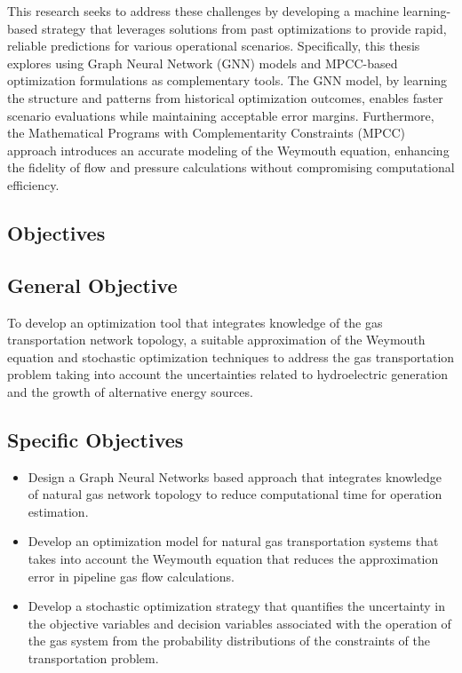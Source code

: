 This research seeks to address these challenges by developing a machine learning-based strategy that leverages solutions from past optimizations to provide rapid, reliable predictions for various operational scenarios. Specifically, this thesis explores using Graph Neural Network (GNN) models and MPCC-based optimization formulations as complementary tools. The GNN model, by learning the structure and patterns from historical optimization outcomes, enables faster scenario evaluations while maintaining acceptable error margins. Furthermore, the Mathematical Programs with Complementarity Constraints (MPCC) approach introduces an accurate modeling of the Weymouth equation, enhancing the fidelity of flow and pressure calculations without compromising computational efficiency.





\subsection{Objectives}

\subsection{General Objective}
To develop an optimization tool that integrates knowledge of the gas transportation network topology, a suitable approximation of the Weymouth equation and stochastic optimization techniques to address the gas transportation problem taking into account the uncertainties related to hydroelectric generation and the growth of alternative energy sources.

\subsection{Specific Objectives}
\begin{itemize}

\item Design a Graph Neural Networks based approach that integrates knowledge of natural gas network topology to reduce computational time for operation estimation.

\item Develop an optimization model for natural gas transportation systems that takes into account the Weymouth equation that reduces the approximation error in pipeline gas flow calculations.

\item Develop a stochastic optimization strategy that quantifies the uncertainty in the objective variables and decision variables associated with the operation of the gas system from the probability distributions of the constraints of the transportation problem.

\end{itemize}









